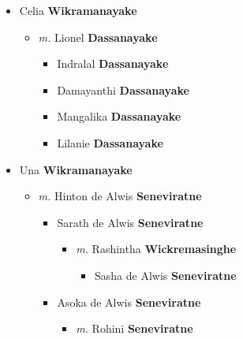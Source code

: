 \documentclass[10pt, openany]{book}
\begin{document}
\begin{itemize}
{\begin{itemize}
{ }
\item{Celia \textbf{Wikramanayake} \textcolor{slorange}{\textit{}}
\begin{itemize}
\item{\textit{m.} Lionel \textbf{Dassanayake} \textcolor{slorange}{\textit{}}   \label{couple:00004081:00004082} \begin{itemize}
\item{Indralal \textbf{Dassanayake} \textcolor{slorange}{\textit{}}
 }
\item{Damayanthi \textbf{Dassanayake} \textcolor{slorange}{\textit{}}
 }
\item{Mangalika \textbf{Dassanayake} \textcolor{slorange}{\textit{}}
 }
\item{Lilanie \textbf{Dassanayake} \textcolor{slorange}{\textit{}}
 }
\end{itemize}}
\end{itemize}
 }
\item{Una \textbf{Wikramanayake} \textcolor{slorange}{\textit{}}
\begin{itemize}
\item{\textit{m.} Hinton de Alwis \textbf{Seneviratne} \textcolor{slorange}{\textit{}}   \label{couple:00004087:00004088} \begin{itemize}
\item{Sarath de Alwis \textbf{Seneviratne} \textcolor{slorange}{\textit{}}
\begin{itemize}
\item{\textit{m.} Rashintha \textbf{Wickremasinghe} \textcolor{slorange}{\textit{}}   \label{couple:00004089:00004090} \begin{itemize}
\item{Sasha de Alwis \textbf{Seneviratne} \textcolor{slorange}{\textit{}}
   }
\end{itemize}}
\end{itemize}
   }
\item{Asoka de Alwis \textbf{Seneviratne} \textcolor{slorange}{\textit{}}
\begin{itemize}
\item{\textit{m.} Rohini \textbf{Seneviratne} \textcolor{slorange}{\textit{}}   \label{couple:00004092:00004093} \begin{itemize}

\end{itemize}}
\end{itemize}}
\end{itemize}}
\end{itemize}}
\end{itemize}}
\end{itemize}
\end{document}
